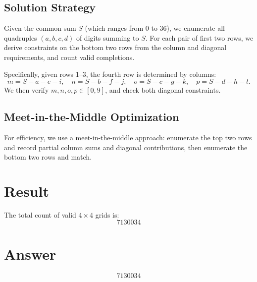 \documentclass[11pt]{article}
\begin{document}
\subsection{Solution Strategy}
Given the common sum $S$ (which ranges from 0 to 36), we enumerate all quadruples $(a,b,c,d)$ of digits summing to $S$. For each pair of first two rows, we derive constraints on the bottom two rows from the column and diagonal requirements, and count valid completions.

Specifically, given rows 1--3, the fourth row is determined by columns:
\[
m = S-a-e-i, \quad n = S-b-f-j, \quad o = S-c-g-k, \quad p = S-d-h-l.
\]
We then verify $m,n,o,p \in [0,9]$, and check both diagonal constraints.

\subsection{Meet-in-the-Middle Optimization}
For efficiency, we use a meet-in-the-middle approach: enumerate the top two rows and record partial column sums and diagonal contributions, then enumerate the bottom two rows and match.

\section{Result}
The total count of valid $4\times 4$ grids is:
\[
\boxed{7130034}
\]

\section{Answer}

\[
\boxed{7130034}
\]
\end{document}
